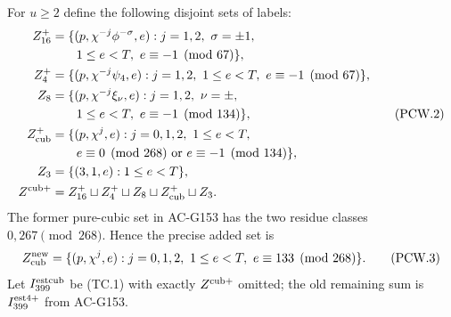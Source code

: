 For $u\geq2$ define the following disjoint sets of labels:
\[
 \begin{aligned}
 Z_{16}^+&=\{(p,\chi^{-j}\phi^{-\sigma},e):j=1,2,\ \sigma=\pm1,\\
 &\hspace{2em}1\leq e<T,\ e\equiv-1\pmod{67}\},\\
 Z_4^+&=\{(p,\chi^{-j}\psi_4,e):j=1,2,
       \ 1\leq e<T,\ e\equiv-1\pmod{67}\},\\
 Z_8&=\{(p,\chi^{-j}\xi_\nu,e):j=1,2,\ \nu=\pm,\\
 &\hspace{2em}1\leq e<T,\ e\equiv-1\pmod{134}\},\\
 Z_{\rm cub}^+&=\{(p,\chi^j,e):j=0,1,2,\ 1\leq e<T,\\
 &\hspace{2em}e\equiv0\pmod{268}\ \text{or}\ e\equiv-1\pmod{134}\},\\
 Z_3&=\{(3,1,e):1\leq e<T\},\\
 Z^{\rm cub+}&=Z_{16}^+\sqcup Z_4^+\sqcup Z_8
                                \sqcup Z_{\rm cub}^+\sqcup Z_3.
 \end{aligned}
 \tag{PCW.2}
\]
The former pure-cubic set in AC-G153 has the two residue classes
$0,267\pmod{268}$.  Hence the precise added set is
\[
 Z_{\rm cub}^{\rm new}=\{(p,\chi^j,e):j=0,1,2,
             \ 1\leq e<T,\ e\equiv133\pmod{268}\}.
 \tag{PCW.3}
\]
Let $I_{399}^{\rm estcub}$ be (TC.1) with exactly
$Z^{\rm cub+}$ omitted; the old remaining sum is
$I_{399}^{\rm est4+}$ from AC-G153.

